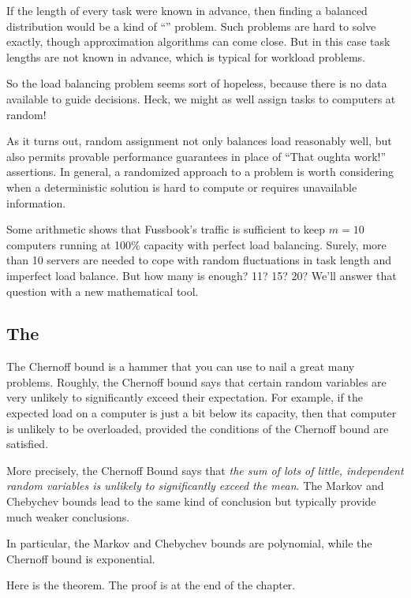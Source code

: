If the length of every task were known in advance, then finding a
balanced distribution would be a kind of ``''
problem.  Such problems are hard to solve exactly, though
approximation algorithms can come close.  But in this case task
lengths are not known in advance, which is typical for workload
problems.

So the load balancing problem seems sort of hopeless, because there is
no data available to guide decisions.  Heck, we might as well assign
tasks to computers at random!

As it turns out, random assignment not only balances load reasonably
well, but also permits provable performance guarantees in place of
``That oughta work!''  assertions.  In general, a randomized approach
to a problem is worth considering when a deterministic solution is
hard to compute or requires unavailable information.

Some arithmetic shows that Fussbook's traffic is sufficient to keep $m
= 10$ computers running at 100\% capacity with perfect load balancing.
Surely, more than 10 servers are needed to cope with random
fluctuations in task length and imperfect load balance.  But how many
is enough?  11?  15?  20?  We'll answer that question with a new
mathematical tool.

\subsection{The }

The Chernoff bound is a hammer that you can use to nail a great many
problems.  Roughly, the Chernoff bound says that certain random
variables are very unlikely to significantly exceed their expectation.
For example, if the expected load on a computer is just a bit below
its capacity, then that computer is unlikely to be overloaded,
provided the conditions of the Chernoff bound are satisfied.

More precisely, the Chernoff Bound says that \emph{the sum of lots of
  little, independent random variables is unlikely to significantly
  exceed the mean}.  The Markov and Chebychev bounds lead to the same
kind of conclusion but typically provide much weaker conclusions.

\begin{editingnotes}
In particular, the Markov and Chebychev bounds are polynomial, while
the Chernoff bound is exponential.
\end{editingnotes}

Here is the theorem.  The proof is at the end of the chapter.

